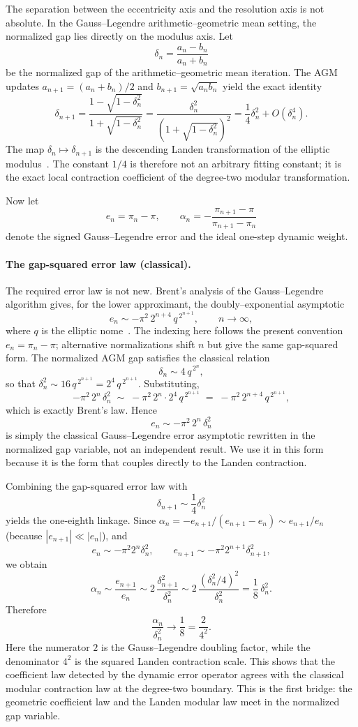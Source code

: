 \documentclass[11pt]{article}
\begin{document}
The separation between the eccentricity axis and the resolution axis is not
absolute. In the Gauss--Legendre arithmetic--geometric mean setting, the
normalized gap lies directly on the modulus axis. Let
\[
\delta_n=\frac{a_n-b_n}{a_n+b_n}
\]
be the normalized gap of the arithmetic--geometric mean iteration. The AGM updates
$a_{n+1}=(a_n+b_n)/2$ and $b_{n+1}=\sqrt{a_nb_n}$ yield the exact identity
\[
\delta_{n+1}=\frac{1-\sqrt{1-\delta_n^2}}{1+\sqrt{1-\delta_n^2}}
=\frac{\delta_n^2}{(1+\sqrt{1-\delta_n^2})^2}
=\frac14\delta_n^2+O(\delta_n^4).
\]
The map $\delta_n\mapsto\delta_{n+1}$ is the descending Landen transformation of
the elliptic modulus~\cite{lawden1989}. The constant $1/4$ is therefore not an
arbitrary fitting constant; it is the exact local contraction coefficient of the
degree-two modular transformation.

Now let
\[
e_n=\pi_n-\pi,
\qquad
\alpha_n=-\frac{\pi_{n+1}-\pi}{\pi_{n+1}-\pi_n}
\]
denote the signed Gauss--Legendre error and the ideal one-step dynamic weight.

\paragraph{The gap-squared error law (classical).}
The required error law is not new. Brent's analysis of the Gauss--Legendre
algorithm gives, for the lower approximant, the doubly--exponential asymptotic
\[
e_n \sim -\pi^2\, 2^{n+4}\, q^{\,2^{n+1}},
\qquad n\to\infty,
\]
where $q$ is the elliptic nome~\cite{brent1976,borwein1987}. The indexing here
follows the present convention $e_n=\pi_n-\pi$; alternative normalizations shift
$n$ but give the same gap-squared form. The normalized AGM
gap satisfies the classical relation
\[
\delta_n \sim 4\, q^{\,2^{n}},
\]
so that $\delta_n^2 \sim 16\, q^{\,2^{n+1}} = 2^4\, q^{\,2^{n+1}}$. Substituting,
\[
-\pi^2\, 2^{n}\, \delta_n^2
\;\sim\;
-\pi^2\, 2^{n}\cdot 2^4\, q^{\,2^{n+1}}
\;=\;
-\pi^2\, 2^{n+4}\, q^{\,2^{n+1}},
\]
which is exactly Brent's law. Hence
\[
\boxed{\,e_n \sim -\pi^2\, 2^{n}\, \delta_n^2\,}
\]
is simply the classical Gauss--Legendre error asymptotic rewritten in the
normalized gap variable, not an independent result. We use it in this form
because it is the form that couples directly to the Landen contraction.

Combining the gap-squared error law with
\[
\delta_{n+1}\sim\frac14\delta_n^2
\]
yields the one-eighth linkage. Since
$\alpha_n=-e_{n+1}/(e_{n+1}-e_n)\sim e_{n+1}/e_n$ (because
$|e_{n+1}|\ll|e_n|$), and
\[
e_n\sim-\pi^2 2^n\delta_n^2,
\qquad
e_{n+1}\sim-\pi^2 2^{n+1}\delta_{n+1}^2,
\]
we obtain
\[
\alpha_n
\sim
\frac{e_{n+1}}{e_n}
\sim
2\,\frac{\delta_{n+1}^2}{\delta_n^2}
\sim
2\,\frac{(\delta_n^2/4)^2}{\delta_n^2}
=
\frac18\,\delta_n^2.
\]
Therefore
\[
\frac{\alpha_n}{\delta_n^2}\longrightarrow\frac18=\frac{2}{4^2}.
\]
Here the numerator $2$ is the Gauss--Legendre doubling factor, while the
denominator $4^2$ is the squared Landen contraction scale. This shows that the
coefficient law detected by the dynamic error operator agrees with the classical
modular contraction law at the degree-two boundary. This is the first bridge: the
geometric coefficient law and the Landen modular law meet in the normalized gap
variable.
\end{document}
